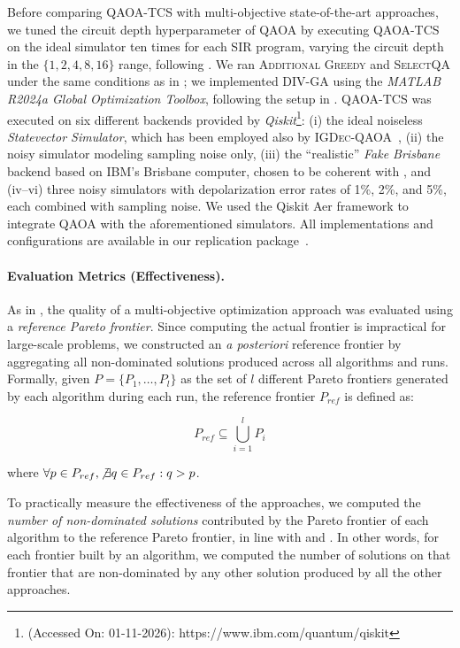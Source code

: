 Before comparing \textsc{QAOA-TCS} with multi-objective state-of-the-art approaches, we tuned the circuit depth hyperparameter of QAOA by executing \textsc{QAOA-TCS} on the ideal simulator ten times for each SIR program, varying the circuit depth in the $\{1,2,4,8,16\}$ range, following \citet{igdec_qaoa}.
We ran \textsc{Additional Greedy} and \textsc{SelectQA} under the same conditions as in \citet{selectqa}; we implemented \textsc{DIV-GA} using the \textit{MATLAB R2024a Global Optimization Toolbox}, following the setup in \citet{panichella2014improving}.
\textsc{QAOA-TCS} was executed on six different backends provided by \textit{Qiskit}\footnote{(Accessed On: 01-11-2026): https://www.ibm.com/quantum/qiskit}: (i) the ideal noiseless \textit{Statevector Simulator}, which has been employed also by \textsc{IGDec-QAOA}~\citep{igdec_qaoa}, (ii) the noisy simulator modeling sampling noise only, (iii) the ``realistic'' \textit{Fake Brisbane} backend based on IBM's Brisbane computer, chosen to be coherent with \citet{igdec_qaoa}, and  (iv–vi) three noisy simulators with depolarization error rates of 1\%, 2\%, and 5\%, each combined with sampling noise.
We used the Qiskit Aer framework to integrate QAOA with the aforementioned simulators.
All implementations and configurations are available in our replication package~\citep{appendix}.

\paragraph{Evaluation Metrics (Effectiveness).}
\label{sec:4.2.3}  
As in \citet{selectqa,panichella2014improving}, the quality of a multi-objective optimization approach was evaluated using a \textit{reference Pareto frontier}. Since computing the actual frontier is impractical for large-scale problems, we constructed an \textit{a posteriori} reference frontier by aggregating all non-dominated solutions produced across all algorithms and runs. Formally, given $P=\{P_1,\ldots,P_l\}$ as the set of $l$ different Pareto frontiers generated by each algorithm during each run, the reference frontier $P_{ref}$ is defined as:

\begin{equation}
P_{ref} \subseteq \bigcup_{i=1}^{l} P_i
\end{equation}

where $\forall p \in P_{ref}, \not\exists q \in P_{ref} : q > p$.  

To practically measure the effectiveness of the approaches, we computed the \textit{number of non-dominated solutions} contributed by the Pareto frontier of each algorithm to the reference Pareto frontier, in line with \citet{panichella2014improving} and \citet{selectqa}. In other words, for each frontier built by an algorithm, we computed the number of solutions on that frontier that are non-dominated by any other solution produced by all the other approaches.

